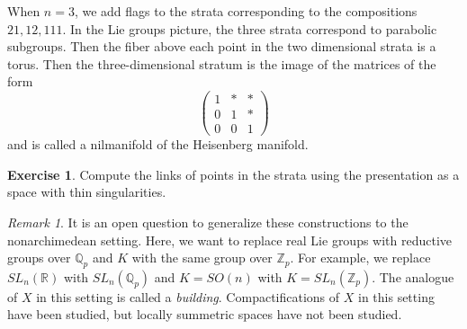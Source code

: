 \documentclass[leqno, openany]{memoir}
\theoremstyle{definition}
\newtheorem{exer}[thm]{Exercise}
\theoremstyle{remark}
\newtheorem{rmk}[thm]{Remark}
\theoremstyle{plain}
\theoremstyle{definition}
\theoremstyle{remark}
\newcommand{\R}{\mathbb{R}}
\newcommand{\Z}{\mathbb{Z}}
\newcommand{\Q}{\mathbb{Q}}
\begin{document}
When $n=3$, we add flags to the strata corresponding to the compositions $21,12,111$. In the Lie groups picture, the three strata correspond to parabolic subgroups. Then the fiber above each point in the two dimensional strata is a torus. Then the three-dimensional stratum is the image of the matrices of the form
\[ \begin{pmatrix}
    1 & * & * \\
    0 & 1 & * \\
    0 & 0 & 1
\end{pmatrix} \]
and is called a nilmanifold of the Heisenberg manifold.

\begin{exer}
    Compute the links of points in the strata using the presentation as a space with thin singularities.
\end{exer}

\begin{rmk}
    It is an open question to generalize these constructions to the nonarchimedean setting. Here, we want to replace real Lie groups with reductive groups over $\Q_p$ and $K$ with the same group over $\Z_p$. For example, we replace $SL_n(\R)$ with $SL_n(\Q_p)$ and $K = SO(n)$ with $K=SL_n(\Z_p)$. The analogue of $X$ in this setting is called a \textit{building}. Compactifications of $X$ in this setting have been studied, but locally summetric spaces have not been studied.
\end{rmk}
\end{document}

